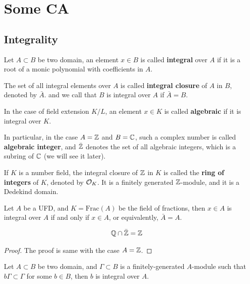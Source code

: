 \section{Some CA}

\subsection{Integrality}

\begin{definition}
    Let \(A \subset B\) be two domain, an element \(x \in B\) is called \textbf{integral} over \(A\) if it is a root of a monic polynomial with coefficients in \(A\). 
    
    The set of all integral elements over \(A\) is called \textbf{integral closure} of \(A\) in \(B\), denoted by \(\bar{A}\). and we call that \(B\) is integral over \(A\) if \(\bar{A} = B\).
\end{definition}

\begin{remark}
    In the case of field extension \(K/L\), an element \(x \in K\) is called \textbf{algebraic} if it is integral over \(K\).

    In particular, in the case \(A =\mathbb{Z}\) and \(B = \mathbb{C}\), such a complex number is called \textbf{algebraic integer}, and \(\bar{\mathbb{Z}}\) denotes the set of all algebraic integers, which is a subring of \(\mathbb{C}\) (we will see it later).
    
    If \(K\) is a number field, the integral closure of \(\mathbb{Z}\) in \(K\) is called the \textbf{ring of integers} of \(K\), denoted by \(\mathcal{O}_K\). It is a finitely generated \(\mathbb{Z}\)-module, and it is a Dedekind domain.
\end{remark}

\begin{proposition}
    Let \(A\) be a UFD, and \(K = \mathrm{Frac}(A)\) be the field of fractions, then \(x \in A\) is integral over \(A\) if and only if \(x \in A\), or equivalently, \(\bar{A} = A\).
\end{proposition}

\begin{corollary}
    \[\mathbb{Q} \cap \bar{\mathbb{Z}} = \mathbb{Z}\]
\end{corollary}

\begin{proof}
    The proof is same with the case \(A = \mathbb{Z}\).
\end{proof}

\begin{lemma}
    Let \(A \subset B\) be two domain, and \(\Gamma \subset B\) is a finitely-generated \(A\)-module such that \(b \Gamma \subset \Gamma\) for some \(b \in B\), then \(b\) is integral over \(A\).
\end{lemma}


